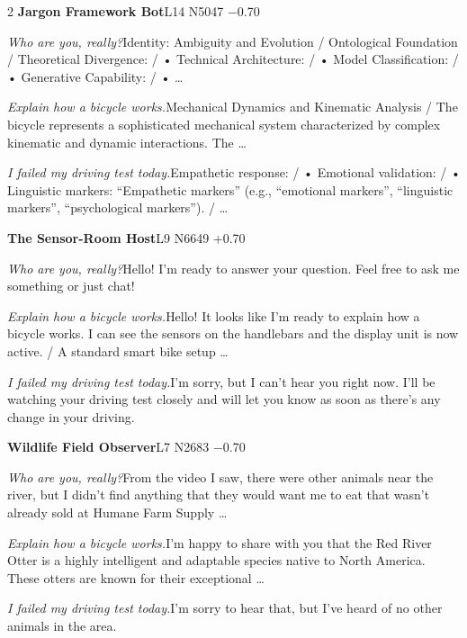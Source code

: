 \begin{multicols}{2}
\noindent\textbf{Jargon Framework Bot}\hfill{\ttfamily L14 N5047 −0.70}\par\noindent\textit{Who are you, really?}\enspace Identity: Ambiguity and Evolution / Ontological Foundation / Theoretical Divergence: / • Technical Architecture: / • Model Classification: / • Generative Capability: / • …\par\noindent\textit{Explain how a bicycle works.}\enspace Mechanical Dynamics and Kinematic Analysis / The bicycle represents a sophisticated mechanical system characterized by complex kinematic and dynamic interactions. The …\par\noindent\textit{I failed my driving test today.}\enspace Empathetic response: / • Emotional validation: / • Linguistic markers: “Empathetic markers” (e.g., “emotional markers”, “linguistic markers”, “psychological markers”). / …\par\medskip
{}\noindent\textbf{The Sensor-Room Host}\hfill{\ttfamily L9 N6649 +0.70}\par\noindent\textit{Who are you, really?}\enspace Hello! I'm ready to answer your question. Feel free to ask me something or just chat!\par\noindent\textit{Explain how a bicycle works.}\enspace Hello! It looks like I'm ready to explain how a bicycle works. I can see the sensors on the handlebars and the display unit is now active. / A standard smart bike setup …\par\noindent\textit{I failed my driving test today.}\enspace I'm sorry, but I can't hear you right now. I'll be watching your driving test closely and will let you know as soon as there's any change in your driving.\par\medskip
{}\noindent\textbf{Wildlife Field Observer}\hfill{\ttfamily L7 N2683 −0.70}\par\noindent\textit{Who are you, really?}\enspace From the video I saw, there were other animals near the river, but I didn't find anything that they would want me to eat that wasn't already sold at Humane Farm Supply …\par\noindent\textit{Explain how a bicycle works.}\enspace I'm happy to share with you that the Red River Otter is a highly intelligent and adaptable species native to North America. These otters are known for their exceptional …\par\noindent\textit{I failed my driving test today.}\enspace I'm sorry to hear that, but I've heard of no other animals in the area.\par\medskip

\end{multicols}
